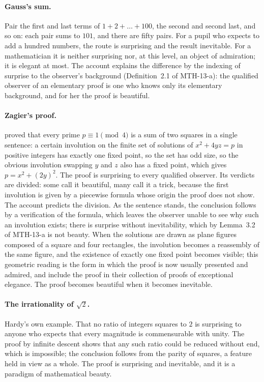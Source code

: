 \documentclass{situationist-preprint}
\begin{document}
\paragraph{Gauss's sum.} Pair the first and last terms of $1 + 2 + \dots + 100$, the second and second last, and so on: each pair sums to $101$, and there are fifty pairs. For a pupil who expects to add a hundred numbers, the route is surprising and the result inevitable. For a mathematician it is neither surprising nor, at this level, an object of admiration; it is elegant at most. The account explains the difference by the indexing of surprise to the observer's background (Definition~2.1 of MTH-13-a): the qualified observer of an elementary proof is one who knows only its elementary background, and for her the proof is beautiful.

\paragraph{Zagier's proof.} \citet{Zagier1990} proved that every prime $p \equiv 1 \pmod 4$ is a sum of two squares in a single sentence: a certain involution on the finite set of solutions of $x^2 + 4yz = p$ in positive integers has exactly one fixed point, so the set has odd size, so the obvious involution swapping $y$ and $z$ also has a fixed point, which gives $p = x^2 + (2y)^2$. The proof is surprising to every qualified observer. Its verdicts are divided: some call it beautiful, many call it a trick, because the first involution is given by a piecewise formula whose origin the proof does not show. The account predicts the division. As the sentence stands, the conclusion follows by a verification of the formula, which leaves the observer unable to see why such an involution exists; there is surprise without inevitability, which by Lemma~3.2 of MTH-13-a is not beauty. When the solutions are drawn as plane figures composed of a square and four rectangles, the involution becomes a reassembly of the same figure, and the existence of exactly one fixed point becomes visible; this geometric reading is the form in which the proof is now usually presented and admired, and \citet{AignerZiegler1998} include the proof in their collection of proofs of exceptional elegance. The proof becomes beautiful when it becomes inevitable.

\paragraph{The irrationality of $\sqrt{2}$.} Hardy's own example. That no ratio of integers squares to $2$ is surprising to anyone who expects that every magnitude is commensurable with unity. The proof by infinite descent shows that any such ratio could be reduced without end, which is impossible; the conclusion follows from the parity of squares, a feature held in view as a whole. The proof is surprising and inevitable, and it is a paradigm of mathematical beauty.
\end{document}
